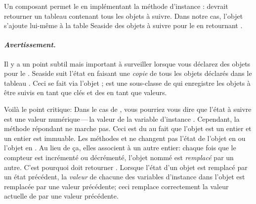 \documentclass[a4paper,10pt,twoside]{book}
\begin{document}
Un composant permet le \backtracking en implémentant la méthode
d'instance :
 devrait retourner un tableau contenant tous les objets à
suivre. Dans notre cas, l'objet  s'ajoute lui-même à la
table Seaside des objets à suivre pour le \backtracking en retournant
.

\paragraph{\emph{Avertissement.}}
Il y a un point subtil mais important à surveiller lorsque vous
déclarez des objets pour le \backtracking.
Seaside suit l'état en faisant une \emph{copie}
de tous les objets déclarés dans le tableau .
Ceci se fait via l'objet
 ;  est une sous-classe
de  qui enregistre les objets à être suivis
en tant que clés et des  en tant que valeurs.


Voilà le point critique:
Dans le cas de , vous pourriez vous dire que l'état à
suivre est une valeur numérique\,---\,la valeur de la variable
d'instance .
Cependant, la méthode  répondant  ne
marche pas.
Ceci est du au fait que l'objet  est un entier et un entier
est immuable.
Les méthodes  et  ne changent pas l'état de
l'objet  en  ou l'objet  en .
Au lieu de ça, elles associent  à un autre entier:
chaque fois que le compteur est incrémenté ou décrémenté, l'objet
nommé  est \emph{remplacé} par un autre.
C'est pourquoi  doit retourner .
Lorsque l'état d'un objet \mbox{} est remplacé par un
état précédent, la \emph{valeur} de chacune des variables d'instance
dans l'objet est remplacée par une valeur précédente; ceci remplace
correctement la valeur actuelle de  par une valeur
précédente.
\end{document}
